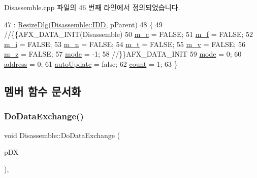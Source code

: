 Disassemble.\+cpp 파일의 46 번째 라인에서 정의되었습니다.


\begin{DoxyCode}
47   : \mbox{\hyperlink{class_resize_dlg_a87bab778e9312f274ebe750d4c3a67ee}{ResizeDlg}}(\mbox{\hyperlink{class_disassemble_ad63913a23ece149e6d04f14419966822a45935fbccc51ff059b05e4200a30d08d}{Disassemble::IDD}}, pParent)
48 \{
49   \textcolor{comment}{//\{\{AFX\_DATA\_INIT(Disassemble)}
50   \mbox{\hyperlink{class_disassemble_aa38e1a7ec55e3fbe47d067e3a46df422}{m\_c}} = FALSE;
51   \mbox{\hyperlink{class_disassemble_aca528eed73b34340d601b725dd688b07}{m\_f}} = FALSE;
52   \mbox{\hyperlink{class_disassemble_a6b51f716f8d8513da506a1d7875ca500}{m\_i}} = FALSE;
53   \mbox{\hyperlink{class_disassemble_ae8c58060e32c1b456fea8c047052a746}{m\_n}} = FALSE;
54   \mbox{\hyperlink{class_disassemble_a477510b19843360a883717917f387412}{m\_t}} = FALSE;
55   \mbox{\hyperlink{class_disassemble_ac8fad0495b1da26907516e83c876ec08}{m\_v}} = FALSE;
56   \mbox{\hyperlink{class_disassemble_ac4b4e68b91013731333b3019bbc16f1d}{m\_z}} = FALSE;
57   \mbox{\hyperlink{class_disassemble_a30b707e1da3b01abda044e78929404cc}{mode}} = -1;
58   \textcolor{comment}{//\}\}AFX\_DATA\_INIT}
59   \mbox{\hyperlink{class_disassemble_a30b707e1da3b01abda044e78929404cc}{mode}} = 0;
60   \mbox{\hyperlink{class_disassemble_a960ac8317ada7182e59132a3ee4afb48}{address}} = 0;
61   \mbox{\hyperlink{class_disassemble_a347234b8c8fa03c0bc21e39c03efc36d}{autoUpdate}} = \textcolor{keyword}{false};
62   \mbox{\hyperlink{class_disassemble_a06c362364d2e01bac10fbcfb7ab28f50}{count}} = 1;
63 \}
\end{DoxyCode}


\subsection{멤버 함수 문서화}
\mbox{\label{class_disassemble_a41d0930174f47e08037b1ea675d03ba0}} 
\subsubsection{\texorpdfstring{Do\+Data\+Exchange()}{DoDataExchange()}}
{\footnotesize\ttfamily void Disassemble\+::\+Do\+Data\+Exchange (\begin{DoxyParamCaption}\item[{C\+Data\+Exchange $\ast$}]{p\+DX }\end{DoxyParamCaption})\hspace{0.3cm}{\ttfamily [protected]}, {\ttfamily [virtual]}}



